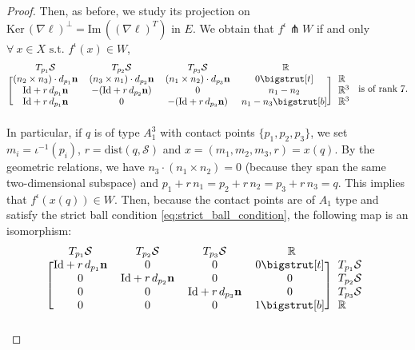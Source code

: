 \documentclass[11pt]{article}
\newcommand{\R}{\mathbb{R}}
\newcommand{\io}{\iota}
\newcommand{\nbf}{\mathbf{n}}
\newcommand{\dist}{\mathrm{dist}}
\newcommand{\Surf}{\mathcal{S}}
\newcommand{\grad}{\nabla}
\newcommand{\Id}{\mathrm{Id}}
\newcommand{\Ker}{\mathrm{Ker} \,}
\renewcommand{\Im}{\mathrm{Im} \,}
\newcommand\topstrut[1][1.2ex]{\setlength\bigstrutjot{#1}{\bigstrut[t]}}
\newcommand\botstrut[1][1.2ex]{\setlength\bigstrutjot{#1}{\bigstrut[b]}}
\theoremstyle{plain}
\theoremstyle{definition}
\theoremstyle{remark}
\begin{document}
\begin{proof}
Then,
as before, we study its projection on $\Ker(\grad \ell)^\perp = \Im((\grad \ell)^T)$ in $E$. We obtain that $f^\io \pitchfork W$ if and only $\forall\ x \in X \text{ s.t. } f^\io(x) \in W$,
\begin{equation*}
\begin{blockarray}{ccccl}
	\begin{block}{ccccl}
		T_{p_1} \Surf & T_{p_2} \Surf & T_{p_3} \Surf & ~~\R~~ & \\
	\end{block}
	\begin{block}{[cccc] l}
		(n_2 \times n_3) \cdot d_{p_1} \nbf & (n_3 \times n_1) \cdot d_{p_2} \nbf & (n_1 \times n_2) \cdot d_{p_3} \nbf & 0 \topstrut  & \R \\
		\Id + r \, d_{p_1} \nbf & - (\Id + r \, d_{p_2} \nbf) & 0 & n_1 - n_2 & \R^3 \\
		\Id + r \, d_{p_1} \nbf & 0 & - (\Id + r \, d_{p_3} \nbf) & n_1 - n_3 \botstrut & \R^3 \\
	\end{block}
\end{blockarray}
 \text{ is of rank } 7.
\end{equation*}
In particular, if $q$ is of type $A_1^3$ with contact points $\{p_1,p_2,p_3\}$, we set $m_i = \io^{-1}(p_i)$, $r = \dist(q, \Surf)$ and $x = (m_1,m_2,m_3,r) = x(q)$. By the geometric relations, we have $n_3 \cdot (n_1 \times n_2) = 0$ (because they span the same two-dimensional subspace) and $p_1 + r \, n_1 = p_2 + r \, n_2 = p_3 + r \, n_3 = q$.
This implies that $f^\io(x(q)) \in W$. Then, because the contact points are of $A_1$ type and satisfy the strict ball condition \eqref{eq:strict_ball_condition}, the following map is an isomorphism:
\begin{equation*}
\begin{blockarray}{ccccl}
	\begin{block}{ccccl}
		T_{p_1} \Surf & T_{p_2} \Surf & T_{p_3} \Surf & ~~\R~~ & \\
	\end{block}
	\begin{block}{[cccc] l}
		\Id + r \, d_{p_1} \nbf & 0 & 0 & 0 \topstrut & T_{p_1} \Surf \\
		0 & \Id + r \, d_{p_2} \nbf & 0 & 0 & T_{p_2} \Surf \\
	 	0 & 0 & \Id + r \, d_{p_3} \nbf & 0 & T_{p_3} \Surf \\
	 	0 & 0 & 0 & 1 \botstrut & \R \\
\end{block}

\end{blockarray}
\end{equation*}
\end{proof}
\end{document}
